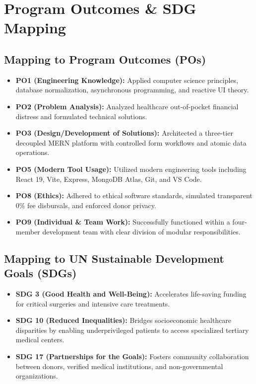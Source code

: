 \documentclass[12pt,a4paper,oneside]{report}
\begin{document}
\chapter{Program Outcomes \& SDG Mapping}

\section{Mapping to Program Outcomes (POs)}
\begin{itemize}
    \item \textbf{PO1 (Engineering Knowledge):} Applied computer science principles, database normalization, asynchronous programming, and reactive UI theory.
    \item \textbf{PO2 (Problem Analysis):} Analyzed healthcare out-of-pocket financial distress and formulated technical solutions.
    \item \textbf{PO3 (Design/Development of Solutions):} Architected a three-tier decoupled MERN platform with controlled form workflows and atomic data operations.
    \item \textbf{PO5 (Modern Tool Usage):} Utilized modern engineering tools including React 19, Vite, Express, MongoDB Atlas, Git, and VS Code.
    \item \textbf{PO8 (Ethics):} Adhered to ethical software standards, simulated transparent 0\% fee disbursals, and enforced donor privacy.
    \item \textbf{PO9 (Individual \& Team Work):} Successfully functioned within a four-member development team with clear division of modular responsibilities.
\end{itemize}

\section{Mapping to UN Sustainable Development Goals (SDGs)}
\begin{itemize}
    \item \textbf{SDG 3 (Good Health and Well-Being):} Accelerates life-saving funding for critical surgeries and intensive care treatments.
    \item \textbf{SDG 10 (Reduced Inequalities):} Bridges socioeconomic healthcare disparities by enabling underprivileged patients to access specialized tertiary medical centers.
    \item \textbf{SDG 17 (Partnerships for the Goals):} Fosters community collaboration between donors, verified medical institutions, and non-governmental organizations.
\end{itemize}
\end{document}
